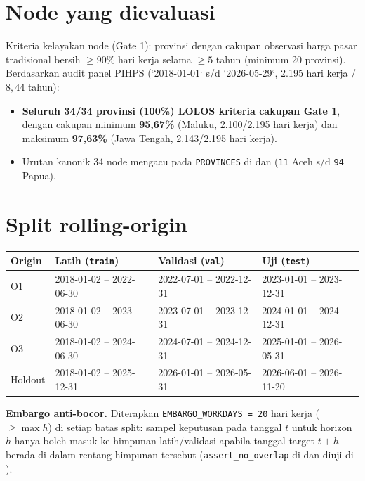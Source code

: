 \documentclass[11pt,a4paper]{article}
\begin{document}
\section{Node yang dievaluasi}
Kriteria kelayakan node (Gate 1): provinsi dengan cakupan observasi harga pasar tradisional bersih $\ge 90\%$ hari kerja selama $\ge 5$ tahun (minimum 20 provinsi). Berdasarkan audit panel PIHPS (`2018-01-01` s/d `2026-05-29`, 2.195 hari kerja / $8{,}44$ tahun):
\begin{itemize}
  \item \textbf{Seluruh 34/34 provinsi (100\%) LOLOS kriteria cakupan Gate 1}, dengan cakupan minimum \textbf{95,67\%} (Maluku, 2.100/2.195 hari kerja) dan maksimum \textbf{97,63\%} (Jawa Tengah, 2.143/2.195 hari kerja).
  \item Urutan kanonik 34 node mengacu pada \texttt{PROVINCES} di  dan  (\texttt{11} Aceh s/d \texttt{94} Papua).
\end{itemize}

\section{Split rolling-origin}
\begin{table}[H]
\centering
\small
\begin{tabular}{@{}l L{3.6cm} L{3.2cm} L{3.6cm}@{}}
\toprule
Origin & Latih (\texttt{train}) & Validasi (\texttt{val}) & Uji (\texttt{test}) \\
\midrule
O1 & 2018-01-02 -- 2022-06-30 & 2022-07-01 -- 2022-12-31 & 2023-01-01 -- 2023-12-31 \\
O2 & 2018-01-02 -- 2023-06-30 & 2023-07-01 -- 2023-12-31 & 2024-01-01 -- 2024-12-31 \\
O3 & 2018-01-02 -- 2024-06-30 & 2024-07-01 -- 2024-12-31 & 2025-01-01 -- 2026-05-31 \\
\midrule
Holdout & 2018-01-02 -- 2025-12-31 & 2026-01-01 -- 2026-05-31 & 2026-06-01 -- 2026-11-20 \\
\bottomrule
\end{tabular}
\end{table}

\textbf{Embargo anti-bocor.} Diterapkan \texttt{EMBARGO\_WORKDAYS = 20} hari kerja ($\ge \max h$) di setiap batas split: sampel keputusan pada tanggal $t$ untuk horizon $h$ hanya boleh masuk ke himpunan latih/validasi apabila tanggal target $t + h$ berada di dalam rentang himpunan tersebut (\texttt{assert\_no\_overlap} di  dan diuji di ).
\end{document}
